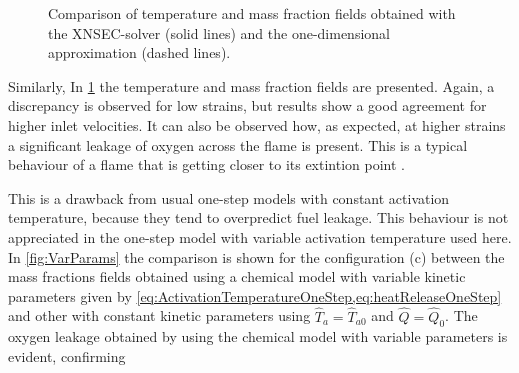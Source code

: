  
 \tikzexternaldisable
 \begin{figure}[p]
 	\centering
 	\caption[Comparison of temperature and mass fraction fields obtained with the XNSEC-solver and the one-dimensional approximation.]{Comparison of temperature and mass fraction fields obtained with the XNSEC-solver (solid lines) and the one-dimensional approximation (dashed lines).}
 	\label{fig:BoSSS_1D_Comparison}
 \end{figure}
 \tikzexternalenable
Similarly, In \cref{fig:BoSSS_1D_Comparison} the temperature and mass fraction fields are presented. Again, a discrepancy is observed for low strains, but results show a good agreement for higher inlet velocities. It can also be observed how, as expected, at higher strains a significant leakage of oxygen across the flame is present. This is a typical behaviour of a flame that is getting closer to its extintion point \cite{fernandez-tarrazoSimpleOnestepChemistry2006}.  

This is a drawback from usual one-step models with constant activation temperature, because they tend to overpredict fuel leakage. This behaviour is not appreciated in the one-step model with variable activation temperature used here.  In \cref{fig:VarParams} the comparison is shown for the configuration (c) between the mass fractions fields obtained using a chemical model with variable kinetic parameters given by \cref{eq:ActivationTemperatureOneStep,eq:heatReleaseOneStep} and other with constant kinetic parameters using $\hat T_a = \hat T_{a0}$ and  $\hat Q = \hat Q_{0}$.  The oxygen leakage obtained by using the chemical model with variable parameters is evident, confirming 
 
